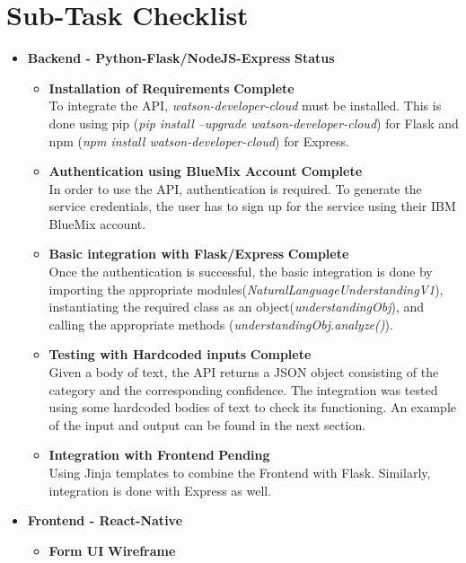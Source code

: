\documentclass[12pt]{article}
\begin{document}
\section{Sub-Task Checklist}
\begin{itemize}
	\item{\textbf{Backend - Python-Flask/NodeJS-Express}} \hfill \textbf{Status}
		\begin{itemize}
			\item \textbf{Installation of Requirements} \hfill \textbf{Complete} \\
				To integrate the API, \emph{watson-developer-cloud} must be installed. This is done using pip (\emph{pip install --upgrade watson-developer-cloud}) for Flask and 
				npm (\emph{npm install watson-developer-cloud}) for Express.
			\item \textbf{Authentication using BlueMix Account} \hfill \textbf{Complete}\\
				In order to use the API, authentication is required. To generate the service credentials, the user has to sign up for the service using their IBM BlueMix account. 
			\item \textbf{Basic integration with Flask/Express} \hfill \textbf{Complete} \\
				Once the authentication is successful, the basic integration is done by importing the appropriate modules(\emph{NaturalLanguageUnderstandingV1}), instantiating the required class as an object(\emph{understandingObj}), and calling the appropriate methods (\emph{understandingObj.analyze()}).
			\item \textbf{Testing with Hardcoded inputs} \hfill \textbf{Complete} \\
				Given a body of text, the API returns a JSON object consisting of the category and the corresponding confidence. The integration was tested using some hardcoded bodies of text to check its functioning. An example of the input and output can be found in the next section.
			\item \textbf{Integration with Frontend} \hfill \textbf{Pending} \\
				Using Jinja templates to combine the Frontend with Flask. Similarly, integration is done with Express as well. 
		\end{itemize}
	\item{\textbf{Frontend - React-Native}}
		\begin{itemize}
			\item \textbf{Form UI} \hfill \textbf{Wireframe} \\

\end{itemize}
\end{itemize}
\end{document}
